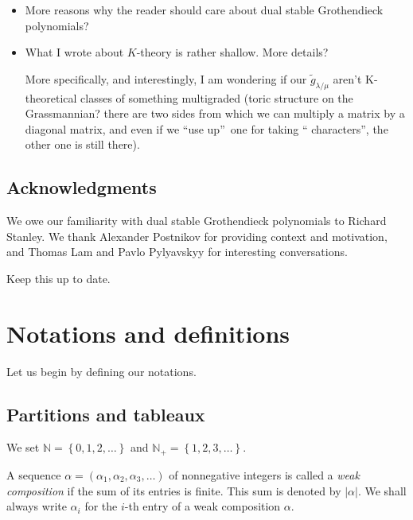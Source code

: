 \documentclass[numbers=enddot,12pt,final,onecolumn,notitlepage]{scrartcl}%
\theoremstyle{definition}
\newenvironment{todo}{}{}
\begin{document}
\begin{todo}
\begin{itemize}
\item More reasons why the reader should
care about dual stable Grothendieck polynomials?

\item What I wrote about $K$-theory is rather shallow. More details?

More specifically, and interestingly, I am wondering if our $\widetilde{g}%
_{\lambda/\mu}$ aren't K-theoretical classes of something multigraded (toric
structure on the Grassmannian? there are two sides from which we can multiply
a matrix by a diagonal matrix, and even if we \textquotedblleft use
up\textquotedblright\ one for taking \textquotedblleft
characters\textquotedblright, the other one is still there).
\end{itemize}
\end{todo}

\subsection{Acknowledgments}

We owe our familiarity with dual stable Grothendieck polynomials to Richard
Stanley. We thank Alexander Postnikov for providing context and motivation,
and Thomas Lam and Pavlo Pylyavskyy for interesting conversations.

\begin{todo}
Keep this up to date.
\end{todo}

\section{\label{sect.notations}Notations and definitions}

Let us begin by defining our notations.

\subsection{Partitions and tableaux}

We set $\mathbb{N}=\left\{  0,1,2,\ldots\right\}  $ and $\mathbb{N}%
_{+}=\left\{  1,2,3,\ldots\right\}  $. 


 A sequence $\alpha=\left(\alpha_{1},\alpha_{2},\alpha_{3},\ldots\right)$ of nonnegative integers is called a \textit{weak composition} if the sum of its entries is finite. This sum is denoted by $\left\vert \alpha\right\vert$.
 We shall always write $\alpha_i$ for the $i$-th entry of a weak composition $\alpha$.
\end{document}
